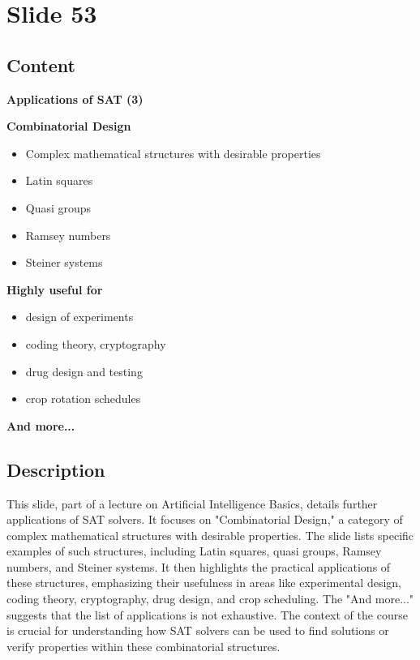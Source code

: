 \documentclass{article}%
\begin{document}
%
\newpage%
\section{Slide 53}%
\label{sec:Slide53}%
\subsection{Content}%

\textbf{Applications of SAT (3)}

\textbf{Combinatorial Design}
\begin{itemize}
    \item Complex mathematical structures with desirable properties
    \item Latin squares
    \item Quasi groups
    \item Ramsey numbers
    \item Steiner systems
\end{itemize}
\textbf{Highly useful for}
\begin{itemize}
    \item design of experiments
    \item coding theory, cryptography
    \item drug design and testing
    \item crop rotation schedules
\end{itemize}
\textbf{And more...}
%
\subsection{Description}%
This slide, part of a lecture on Artificial Intelligence Basics, details further applications of SAT solvers.  It focuses on "Combinatorial Design," a category of complex mathematical structures with desirable properties.  The slide lists specific examples of such structures, including Latin squares, quasi groups, Ramsey numbers, and Steiner systems.  It then highlights the practical applications of these structures, emphasizing their usefulness in areas like experimental design, coding theory, cryptography, drug design, and crop scheduling.  The "And more..." suggests that the list of applications is not exhaustive.  The context of the course is crucial for understanding how SAT solvers can be used to find solutions or verify properties within these combinatorial structures.%
\end{document}
